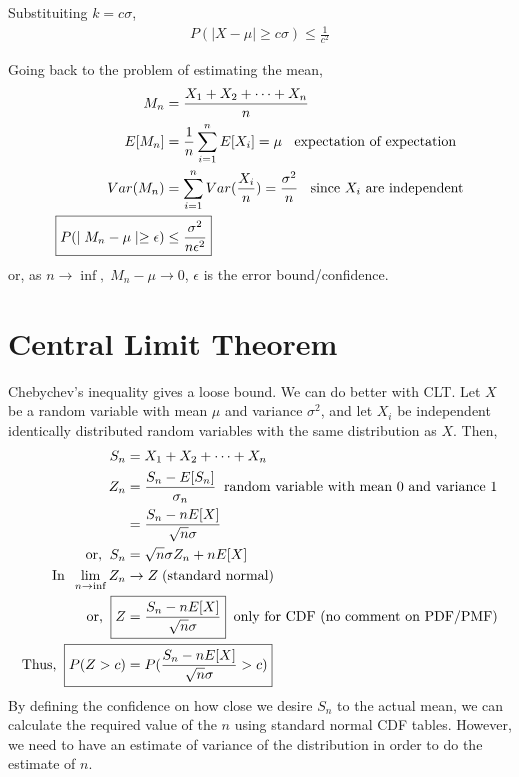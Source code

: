 \documentclass[../probability-notes.tex]{subfiles}
\begin{document}
    Substituiting $k = c\sigma$,
    \begin{align*}
        P(\lvert X - \mu \rvert \geq c\sigma) \leq \frac{1}{c^{2}}
    \end{align*}

    Going back to the problem of estimating the mean,
    \begin{align*}
        M_{n} &= \frac{X_{1} + X_{2} + \cdots + X_{n}}{n} \\
        E[M_{n}] &= \frac{1}{n} \sum_{i=1}^{n} E[X_{i}] = \mu \text{\;\; expectation of expectation} \\
        Var(M_{n}) &= \sum_{i=1}^{n} Var(\frac{X_{i}}{n}) = \frac{\sigma^{2}}{n} \text{\;\; since $X_{i}$ are independent} \\
        \Aboxed{P(\mid M_{n} - \mu \mid \geq \epsilon) &\leq \frac{\sigma^{2}}{n\epsilon^{2}}}
    \end{align*}
    or, as $n \rightarrow \inf,\; M_{n} - \mu \rightarrow 0$, $\epsilon$ is the error bound/confidence.

    \section{Central Limit Theorem}
    Chebychev's inequality gives a loose bound. We can do better with CLT. Let $X$ be a random variable with mean $\mu$ and variance $\sigma^{2}$, and let $X_{i}$ be independent identically distributed random variables with the same distribution as $X$. Then,
    \begin{align*}
        S_{n} &= X_{1} + X_{2} + \cdots + X_{n}\\
        Z_{n} &= \frac{S_{n} - E[S_{n}]}{\sigma_{n}} \text{\;\;random variable with mean $0$ and variance $1$} \\
             &= \frac{S_{n} - nE[X]}{\sqrt{n} \sigma}\\
        \text{or,\;\;} S_{n} &= \sqrt{n} \sigma Z_{n} + nE[X] \\
        \text{In\;\;} \lim_{n \to \inf} Z_{n} &\rightarrow Z \text{\;(standard normal)}\\
        \text{or,\;\;} \Aboxed{Z &= \frac{S_{n} - nE[X]}{\sqrt{n} \sigma}} \text{\;\;only for CDF (no comment on PDF/PMF)}\\
        \text{Thus,\;\;} \Aboxed{P(Z > c) &= P(\frac{S_{n} - nE[X]}{\sqrt{n} \sigma} > c)}
    \end{align*}
    By defining the confidence on how close we desire $S_{n}$ to the actual mean, we can calculate the required value of the $n$ using standard normal CDF tables. However, we need to have an estimate of variance of the distribution in order to do the estimate of $n$.
\end{document}
